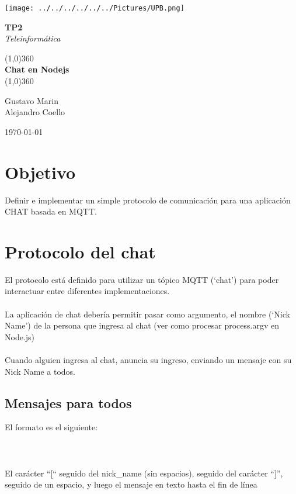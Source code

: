 \documentclass{article}
\begin{document}
	\begin{titlepage}
		\begin{center}
			\vspace*{2cm}
			
			\texttt{[image: ../../../../../../Pictures/UPB.png]}
			\vfill
			
			\Huge{\textbf{TP2}}\\[5mm]
			
			\huge{\slshape{Teleinform\'atica}}
			\vfill
			
			\line(1,0){360}\\[3mm]
			\Huge{\textbf{Chat en Nodejs}}\\[1mm] 
			\line(1,0){360}\\[2cm]
			\begin{center}
				\Large{Gustavo Marin}
				\\
				\Large{Alejandro Coello}
			\end{center}
			
			\vfill
			\large{\today}
		\end{center}
	\end{titlepage}
\section{Objetivo}
\noindent Definir	e implementar un simple protocolo de comunicación para una aplicación CHAT basada en MQTT.
\section{Protocolo del chat}
\noindent El	protocolo	está	definido	para	utilizar	un	tópico	MQTT	(‘chat’)	para	poder	interactuar	entre	
diferentes	implementaciones.
\\~\\
La	aplicación	de	chat	debería	permitir	pasar	como	argumento,	el	nombre	(‘Nick	Name’)	de	la	
persona	que	ingresa	al	chat (ver	como	procesar	process.argv en	Node.js)
\\~\\
Cuando	alguien	ingresa	al	chat,	anuncia	su	ingreso,	enviando	un	mensaje	con	su	Nick Name	a	
todos.
\subsection{Mensajes para todos}
\noindent El formato es el siguiente:
\\~\\
\\~\\
El	carácter “[“ seguido	del	nick\_name	(sin	espacios),	seguido	del	carácter “]”,	seguido	de	
un	espacio,	y	luego	el	mensaje	en	texto	hasta	el	fin	de	línea
\end{document}
